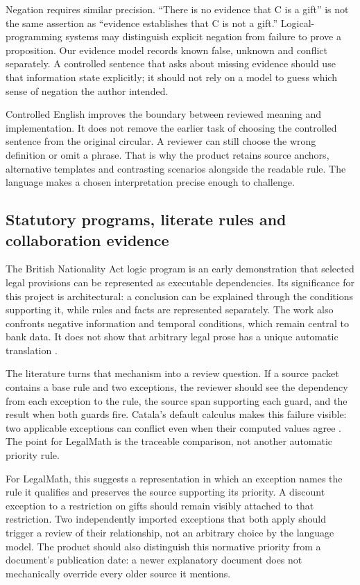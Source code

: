 Negation requires similar precision. ``There is no evidence that C is a gift''
is not the same assertion as ``evidence establishes that C is not a gift.''
Logical-programming systems may distinguish explicit negation from failure to
prove a proposition. Our evidence model records known false, unknown and
conflict separately. A controlled sentence that asks about missing evidence
should use that information state explicitly; it should not rely on a model
to guess which sense of negation the author intended.

Controlled English improves the boundary between reviewed meaning and
implementation. It does not remove the earlier task of choosing the controlled
sentence from the original circular. A reviewer can still choose the wrong
definition or omit a phrase. That is why the product retains source anchors,
alternative templates and contrasting scenarios alongside the readable rule.
The language makes a chosen interpretation precise enough to challenge.

\subsection{Statutory programs, literate rules and collaboration evidence}
\label{merge:P-02-literature:02}


The British Nationality Act logic program is an early demonstration that selected
legal provisions can be represented as executable dependencies. Its significance
for this project is architectural: a conclusion can be explained through the
conditions supporting it, while rules and facts are represented separately.
The work also confronts negative information and temporal conditions, which
remain central to bank data. It does not show that arbitrary legal prose has a
unique automatic translation \citep{sergot1986}.

The literature turns that mechanism into a review question. If a source packet
contains a base rule and two exceptions, the reviewer should see the dependency
from each exception to the rule, the source span supporting each guard, and the
result when both guards fire. Catala's default calculus makes this failure
visible: two applicable exceptions can conflict even when their computed values
agree \citep[secs.~3--4]{catala2021}. The point for LegalMath is the traceable
comparison, not another automatic priority rule.

For LegalMath, this suggests a representation in which an exception names the
rule it qualifies and preserves the source supporting its priority. A discount
exception to a restriction on gifts should remain visibly attached to that
restriction. Two independently imported exceptions that both apply should trigger
a review of their relationship, not an arbitrary choice by the language model.
The product should also distinguish this normative priority from a document's
publication date: a newer explanatory document does not mechanically override
every older source it mentions.


